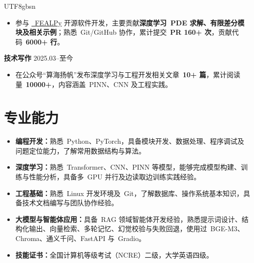 \documentclass[10.5pt,a4paper]{article}
\newcommand{\resumeItem}[1]{\item #1}
\newcommand{\subTitle}[2]{
  \textbf{#1}
  \hfill
  #2
}
\begin{document}
\begin{CJK*}{UTF8}{gbsn}
\begin{itemize}
\resumeItem{参与
\href{https://github.com/chenchunmei-daphne/fealpy}{\ FEALPy}
开源软件开发，主要贡献\textbf{深度学习\ PDE 求解、有限差分模块及相关示例}；熟悉\ Git/GitHub 协作，累计提交\ \textbf{PR 160+ 次}，贡献代码\ \textbf{6000+ 行}。}

\end{itemize}

\vspace{0.20em}

\subTitle{技术写作}{2025.03--至今}

\begin{itemize}

\resumeItem{在公众号“算海扬帆”发布深度学习与工程开发相关文章\ \textbf{10+ 篇}，累计阅读量\ \textbf{10000+}，内容涵盖\ PINN、CNN 及工程实践。}

\end{itemize}

\section*{专业能力}

\begin{itemize}

\resumeItem{\textbf{编程开发：}熟悉\ Python、PyTorch，具备模块开发、数据处理、程序调试及问题定位能力，了解常用数据结构与算法。}

\resumeItem{\textbf{深度学习：}熟悉\ Transformer、CNN、PINN 等模型，能够完成模型构建、训练与性能分析，具备多\ GPU 并行及边读取边训练实践经验。}

\resumeItem{\textbf{工程基础：}熟悉\ Linux 开发环境及\ Git，了解数据库、操作系统基本知识，具备技术文档编写与团队协作经验。}

\resumeItem{\textbf{大模型与智能体应用：}具备\ RAG 领域智能体开发经验，熟悉提示词设计、结构化输出、向量检索、多轮记忆、幻觉校验与失败回退，使用过\ BGE-M3、Chroma、通义千问、FastAPI 与\ Gradio。}

\resumeItem{\textbf{技能证书：}全国计算机等级考试（NCRE）二级，大学英语四级。}

\end{itemize}

\end{CJK*}
\end{document}
